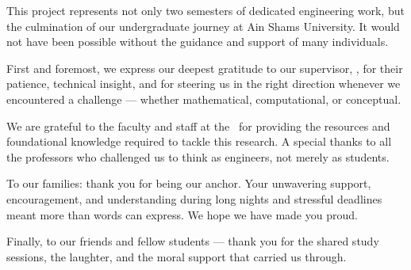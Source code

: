 \documentclass[11pt, a4paper, twoside, openright]{book}
\begin{document}
\begin{acknowledgements}
    \addchaptertocentry{\acknowledgementname}

    This project represents not only two semesters of dedicated engineering work,
    but the culmination of our undergraduate journey at Ain Shams University.
    It would not have been possible without the guidance and support of many
    individuals.

    First and foremost, we express our deepest gratitude to our supervisor,
    \supname, for their patience, technical insight, and for steering us in the
    right direction whenever we encountered a challenge --- whether mathematical,
    computational, or conceptual.

    We are grateful to the faculty and staff at the \deptname\ for providing the
    resources and foundational knowledge required to tackle this research. A
    special thanks to all the professors who challenged us to think as engineers,
    not merely as students.

    To our families: thank you for being our anchor. Your unwavering support,
    encouragement, and understanding during long nights and stressful deadlines
    meant more than words can express. We hope we have made you proud.

    Finally, to our friends and fellow students --- thank you for the shared study
    sessions, the laughter, and the moral support that carried us through.

\end{acknowledgements}

{\hypersetup{linkcolor=black}
\tableofcontents
\clearpage

{}
\listoffigures
\clearpage

{}
\listoftables
\clearpage
}
\end{document}
